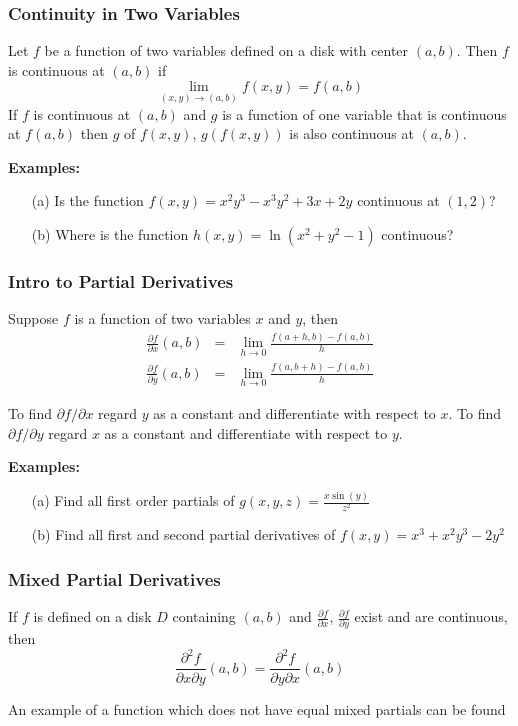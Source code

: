 \documentclass{beamer}
\begin{document}
\begin{frame}
\frametitle{Continuity in Two Variables}
Let $f$ be a function of two variables defined on a disk with center $(a,b)$. Then $f$ is continuous at $(a,b)$ if
$$\lim\limits_{(x,y) \to (a,b)} f(x,y) = f(a,b)$$
If $f$ is continuous at $(a,b)$ and $g$ is a function of one variable that is continuous at $f(a,b)$ then $g$ of $f(x,y)$, $g(f(x,y))$ is also continuous at $(a,b)$.

\vspace{6pt}
\textbf{Examples:}
\begin{itemize}
	\item[(a)] Is the function $f(x,y) = x^2y^3 - x^3y^2 + 3x + 2y$ continuous at $(1,2)$?
	\item[(b)] Where is the function $h(x,y) = \ln (x^2 + y^2 -1)$ continuous?
\end{itemize}
\end{frame}

\begin{frame}
\frametitle{Intro to Partial Derivatives}
Suppose $f$ is a function of two variables $x$ and $y$, then
\begin{eqnarray*}
	\frac{\partial f}{\partial x}(a,b) &=& \lim\limits_{h \to 0} \frac{f(a+h,b)-f(a,b)}{h} \\
	\frac{\partial f}{\partial y}(a,b) &=& \lim\limits_{h \to 0} \frac{f(a,b+h)-f(a,b)}{h}
\end{eqnarray*}

To find $\partial f/ \partial x$ regard $y$ as a constant and differentiate with respect to $x$. To find $\partial f/ \partial y$ regard $x$ as a constant and differentiate with respect to $y$.

\vspace{6pt}
\textbf{Examples:}\\
\begin{itemize}
	\item[(a)] Find all first order partials of $g(x,y,z) = \frac{x \sin (y)}{z^2}$
	\item[(b)] Find all first and second partial derivatives of $f(x,y) = x^3 + x^2y^3 - 2y^2$
\end{itemize}
\end{frame}

\begin{frame}
\frametitle{Mixed Partial Derivatives}
\begin{theorem}
	If $f$ is defined on a disk $D$ containing $(a,b)$ and $\frac{\partial f}{\partial x}$, $\frac{\partial f}{\partial y}$ exist and are continuous, then
	$$ \frac{\partial^2 f}{\partial x \partial y} (a,b) = \frac{\partial^2 f}{\partial y \partial x} (a,b)$$
\end{theorem}

\vspace{12pt}
An example of a function which does not have equal mixed partials can be found \href{https://www.math.tamu.edu/~tom.vogel/gallery/node18.html}{}
\end{frame}
\end{document}
